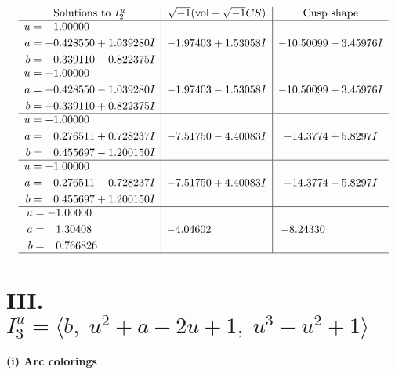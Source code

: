 \documentclass[1p]{elsarticle_modified}
\theoremstyle{definition}
\newcommand{\I}{\sqrt{-1}}
\begin{document}
$$\begin{array}{c|c|c}  
\text{Solutions to }I^u_{2}& \I (\text{vol} + \sqrt{-1}CS) & \text{Cusp shape}\\
 \hline 
\begin{aligned}
u &= -1.00000\phantom{ +0.000000I} \\
a &= -0.428550 + 1.039280 I \\
b &= -0.339110 - 0.822375 I\end{aligned}
 & -1.97403 + 1.53058 I & -10.50099 - 3.45976 I \\ \hline\begin{aligned}
u &= -1.00000\phantom{ +0.000000I} \\
a &= -0.428550 - 1.039280 I \\
b &= -0.339110 + 0.822375 I\end{aligned}
 & -1.97403 - 1.53058 I & -10.50099 + 3.45976 I \\ \hline\begin{aligned}
u &= -1.00000\phantom{ +0.000000I} \\
a &= \phantom{-}0.276511 + 0.728237 I \\
b &= \phantom{-}0.455697 - 1.200150 I\end{aligned}
 & -7.51750 - 4.40083 I & -14.3774 + 5.8297 I \\ \hline\begin{aligned}
u &= -1.00000\phantom{ +0.000000I} \\
a &= \phantom{-}0.276511 - 0.728237 I \\
b &= \phantom{-}0.455697 + 1.200150 I\end{aligned}
 & -7.51750 + 4.40083 I & -14.3774 - 5.8297 I \\ \hline\begin{aligned}
u &= -1.00000\phantom{ +0.000000I} \\
a &= \phantom{-}1.30408\phantom{ +0.000000I} \\
b &= \phantom{-}0.766826\phantom{ +0.000000I}\end{aligned}
 & -4.04602\phantom{ +0.000000I} & -8.24330\phantom{ +0.000000I}\\
 \hline 
 \end{array}$$\newpage\newpage\renewcommand{\arraystretch}{1}
\centering \section*{III. $I^u_{3}= \langle b,\;u^2+a-2 u+1,\;u^3- u^2+1 \rangle$}
\flushleft \textbf{(i) Arc colorings}\\
\end{document}
